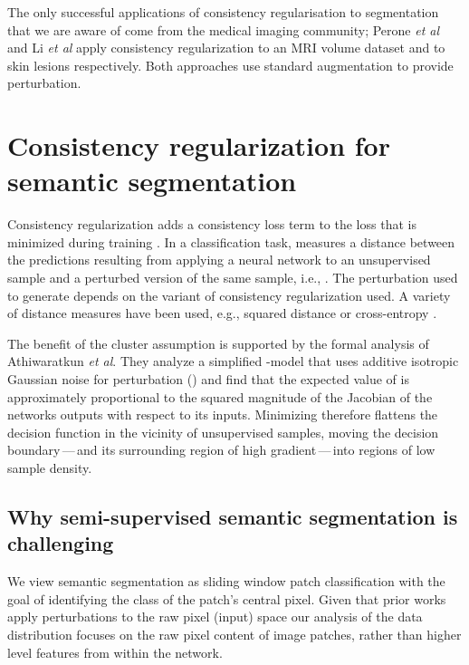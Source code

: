 \documentclass{bmvc2k}
\def\etal{\emph{et al}\bmvaOneDot}
\begin{document}
The only successful applications of consistency regularisation to segmentation that we are aware of come from the medical imaging community;
Perone \etal \cite{Perone:SemiSupSeg} and Li \etal \cite{Li:SemiSupSkin} apply consistency regularization to an MRI volume dataset and to skin lesions respectively. Both approaches use standard augmentation to provide perturbation.


\section{Consistency regularization for semantic segmentation}
\label{sec:cons_reg}

Consistency regularization adds a consistency loss term  to the loss that is minimized during training \cite{Oliver:RealisticEval}.
In a classification task,  measures a distance  between the predictions resulting from applying a neural network
 to an unsupervised sample  and a perturbed version  of the same sample, i.e., .
The perturbation used to generate  depends on the variant of consistency regularization used. A variety of distance measures
 have been used, e.g., squared distance \cite{Laine:Temporal} or cross-entropy \cite{Miyato:VATSemiSup}.


The benefit of the cluster assumption is supported by the formal analysis of Athiwaratkun \etal \cite{Athiwaratkun:ConsRegSWA}.
They analyze a simplified -model \cite{Laine:Temporal} that uses additive isotropic Gaussian noise for perturbation () and
find that the expected value of  is approximately proportional to the squared magnitude of the Jacobian  of the networks outputs with respect to its inputs.
Minimizing  therefore flattens the decision function in the vicinity of unsupervised samples, moving the 
decision boundary\,---\,and its surrounding region of high gradient\,---\,into regions of low sample density.






\subsection{Why semi-supervised semantic segmentation is challenging}
\label{sec:semseghard}

We view semantic segmentation as sliding window patch classification with the goal of identifying the class of the patch's central pixel.
Given that prior works~\cite{Laine:Temporal,Miyato:VATSemiSup,Sohn:FixMatch} apply perturbations to the raw pixel (input) space our analysis of the data distribution
focuses on the raw pixel content of image patches, rather than higher level features from within the network.
\end{document}
